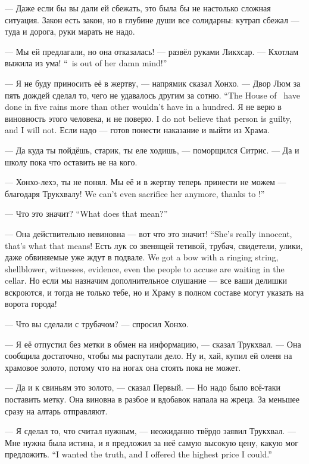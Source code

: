 --- Даже если бы вы дали ей сбежать, это была бы не настолько сложная ситуация.
Закон есть закон, но в глубине души все солидарны: кутрап сбежал --- туда и дорога, руки марать не надо.

--- Мы ей предлагали, но она отказалась! --- развёл руками Ликхсар.
{--- Кхотлам выжила из ума!}
{``\Kchotlam\ is out of her damn mind!''}

--- Я не буду приносить её в жертву, --- напрямик сказал Хонхо.
{--- Двор Люм за пять дождей сделал то, чего не удавалось другим за сотню.}
{``The House of \Loem\ have done in five rains more than other wouldn't have in a hundred.}
{Я не верю в виновность этого человека, и не поверю.}
{I do not believe that person is guilty, and I will not.}
Если надо --- готов понести наказание и выйти из Храма.

--- Да куда ты пойдёшь, старик, ты еле ходишь, --- поморщился Ситрис.
--- Да и школу пока что оставить не на кого.

--- Хонхо-лехэ, ты не понял.
{Мы её и в жертву теперь принести не можем --- благодаря Трукхвалу!}
{We can't even sacrifice her anymore, thanks to \Trukchual!''}

{--- Что это значит?}
{``What does that mean?''}

{--- Она действительно невиновна --- вот что это значит!}
{``She's really innocent, that's what that means!}
{Есть лук со звенящей тетивой, трубач, свидетели, улики, даже обвиняемые уже ждут в подвале.}
{We got a bow with a ringing string, shellblower, witnesses, evidence, even the people to accuse are waiting in the cellar.}
Но если мы назначим дополнительное слушание --- все ваши делишки вскроются, и тогда не только тебе, но и Храму в полном составе могут указать на ворота города!

--- Что вы сделали с трубачом? --- спросил Хонхо.

--- Я её отпустил без метки в обмен на информацию, --- сказал Трукхвал.
--- Она сообщила достаточно, чтобы мы распутали дело.
Ну и, хай, купил ей оленя на храмовое золото, потому что на ногах она стоять пока не может.

--- Да и к свиньям это золото, --- сказал Первый.
--- Но надо было всё-таки поставить метку.
Она виновна в разбое и вдобавок напала на жреца.
За меньшее сразу на алтарь отправляют.

--- Я сделал то, что считал нужным, --- неожиданно твёрдо заявил Трукхвал.
{--- Мне нужна была истина, и я предложил за неё самую высокую цену, какую мог предложить.}
{``I wanted the truth, and I offered the highest price I could.''}

